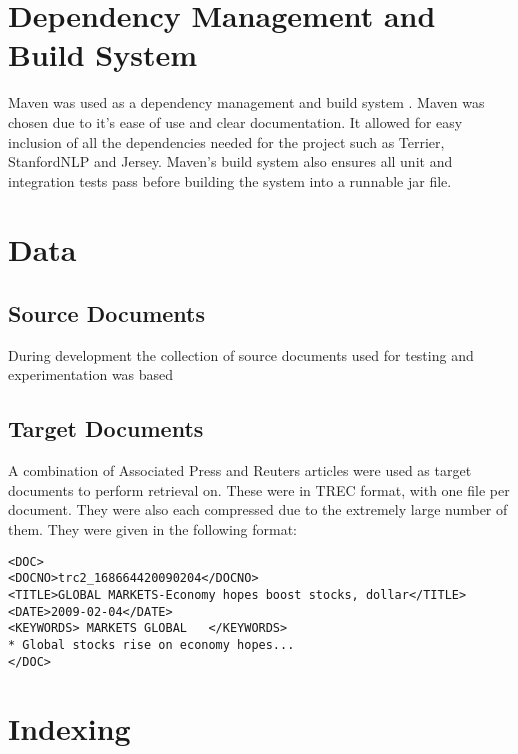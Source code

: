 \documentclass{l4proj}
\begin{document}
\section{Dependency Management and Build System}
Maven was used as a dependency management and build system \cite{maven}. Maven was chosen due to it's ease of use and clear documentation. It allowed for easy inclusion of all the dependencies needed for the project such as Terrier, StanfordNLP and Jersey. Maven's build system also ensures all unit and integration tests pass before building the system into a runnable jar file.

\section{Data}
\subsection{Source Documents}
During development the collection of source documents used for testing and experimentation was based 
\subsection{Target Documents}
A combination of Associated Press and Reuters articles were used as target documents to perform retrieval on. These were in TREC format, with one file per document. They were also each compressed due to the extremely large number of them.
They were given in the following format:
\begin{verbatim}
<DOC>
<DOCNO>trc2_168664420090204</DOCNO>
<TITLE>GLOBAL MARKETS-Economy hopes boost stocks, dollar</TITLE>
<DATE>2009-02-04</DATE>
<KEYWORDS> MARKETS GLOBAL   </KEYWORDS>
* Global stocks rise on economy hopes...
</DOC>
\end{verbatim}
\section{Indexing}
\end{document}
